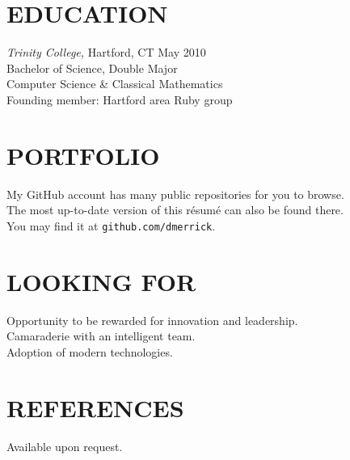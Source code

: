 \documentclass[line,margin]{res}
\begin{document}
\begin{resume}
\section{EDUCATION}
  {\sl Trinity College,}
  Hartford, CT \hfill May 2010 \\
  Bachelor of Science, Double Major \\
  Computer Science \& Classical Mathematics \\
  Founding member: Hartford area Ruby group

\section{PORTFOLIO}
  My GitHub account has many public repositories for you to browse. \\
  The most up-to-date version of this r\'{e}sum\'{e} can also be found there. \\
  You may find it at \texttt{github.com/dmerrick}.

\section{LOOKING FOR}
  Opportunity to be rewarded for innovation and leadership. \\
  Camaraderie with an intelligent team. \\
  Adoption of modern technologies.

\section{REFERENCES}
  Available upon request.

\end{resume}
\end{document}
